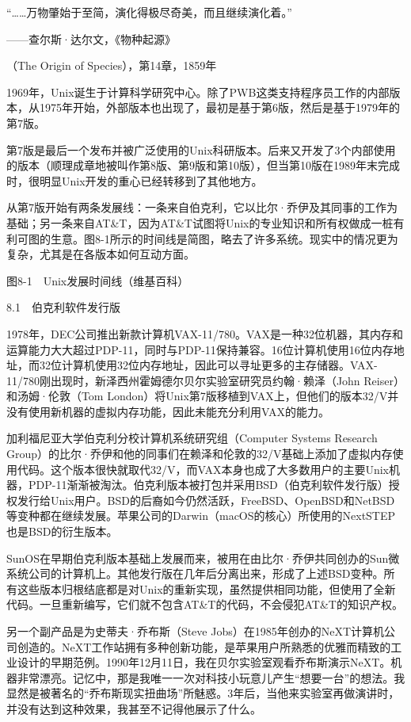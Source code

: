 \documentclass[a4paper,12pt,UTF8,twoside]{ctexbook}
\begin{document}
“……万物肇始于至简，演化得极尽奇美，而且继续演化着。”

——查尔斯·达尔文，《物种起源》

（The Origin of Species），第14章，1859年

1969年，Unix诞生于计算科学研究中心。除了PWB这类支持程序员工作的内部版本，从1975年开始，外部版本也出现了，最初是基于第6版，然后是基于1979年的第7版。

第7版是最后一个发布并被广泛使用的Unix科研版本。后来又开发了3个内部使用的版本（顺理成章地被叫作第8版、第9版和第10版），但当第10版在1989年末完成时，很明显Unix开发的重心已经转移到了其他地方。

从第7版开始有两条发展线：一条来自伯克利，它以比尔·乔伊及其同事的工作为基础；另一条来自AT\&T，因为AT\&T试图将Unix的专业知识和所有权做成一桩有利可图的生意。图8-1所示的时间线是简图，略去了许多系统。现实中的情况更为复杂，尤其是在各版本如何互动方面。



图8-1　Unix发展时间线（维基百科）





8.1　伯克利软件发行版


1978年，DEC公司推出新款计算机VAX-11/780。VAX是一种32位机器，其内存和运算能力大大超过PDP-11，同时与PDP-11保持兼容。16位计算机使用16位内存地址，而32位计算机使用32位内存地址，因此可以寻址更多的主存储器。VAX-11/780刚出现时，新泽西州霍姆德尔贝尔实验室研究员约翰·赖泽（John Reiser）和汤姆·伦敦（Tom London）将Unix第7版移植到VAX上，但他们的版本32/V并没有使用新机器的虚拟内存功能，因此未能充分利用VAX的能力。

加利福尼亚大学伯克利分校计算机系统研究组（Computer Systems Research Group）的比尔·乔伊和他的同事们在赖泽和伦敦的32/V基础上添加了虚拟内存使用代码。这个版本很快就取代32/V，而VAX本身也成了大多数用户的主要Unix机器，PDP-11渐渐被淘汰。伯克利版本被打包并采用BSD（伯克利软件发行版）授权发行给Unix用户。BSD的后裔如今仍然活跃，FreeBSD、OpenBSD和NetBSD等变种都在继续发展。苹果公司的Darwin（macOS的核心）所使用的NextSTEP也是BSD的衍生版本。

SunOS在早期伯克利版本基础上发展而来，被用在由比尔·乔伊共同创办的Sun微系统公司的计算机上。其他发行版在几年后分离出来，形成了上述BSD变种。所有这些版本归根结底都是对Unix的重新实现，虽然提供相同功能，但使用了全新代码。一旦重新编写，它们就不包含AT\&T的代码，不会侵犯AT\&T的知识产权。

另一个副产品是为史蒂夫·乔布斯（Steve Jobs）在1985年创办的NeXT计算机公司创造的。NeXT工作站拥有多种创新功能，是苹果用户所熟悉的优雅而精致的工业设计的早期范例。1990年12月11日，我在贝尔实验室观看乔布斯演示NeXT。机器非常漂亮。记忆中，那是我唯一一次对科技小玩意儿产生“想要一台”的想法。我显然是被著名的“乔布斯现实扭曲场”所魅惑。3年后，当他来实验室再做演讲时，并没有达到这种效果，我甚至不记得他展示了什么。
\end{document}
